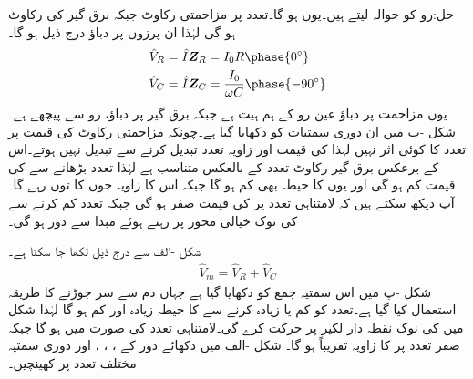 حل:رو کو حوالہ لیتے ہیں۔یوں  ہو گا۔تعدد  پر مزاحمتی رکاوٹ  جبکہ  برق گیر کی رکاوٹ  ہو گی لہٰذا ان پرزوں پر دباؤ درج ذیل ہو گا۔
\begin{align*}
\hat{V}_R&=\hat{I} \bZ_R=I_0 R \phase{0^{\circ}}\\
\hat{V}_C&=\hat{I} \bZ_C=\frac{I_0}{ \omega C} \phase{-90^{\circ}}
\end{align*}
یوں مزاحمت پر دباؤ عین رو کے ہم ہیت ہے جبکہ برق گیر پر دباؤ، رو سے  پیچھے ہے۔شکل -ب میں ان دوری سمتیات کو دکھایا گیا ہے۔چونکہ مزاحمتی رکاوٹ کی قیمت پر تعدد کا کوئی اثر نہیں لہٰذا  کی قیمت اور زاویہ تعدد تبدیل کرنے سے تبدیل نہیں ہوتے۔اس کے برعکس برق گیر رکاوٹ تعدد کے بالعکس متناسب ہے لہٰذا تعدد بڑھانے سے  کی قیمت کم ہو گی اور یوں  کا حیطہ بھی کم ہو گا جبکہ اس کا زاویہ جوں کا توں رہے گا۔آپ دیکھ سکتے ہیں کہ لامتناہی تعدد پر  کی قیمت صفر ہو گی جبکہ تعدد کم کرنے سے  کی نوک خیالی محور پر رہتے ہوئے  مبدا سے دور ہو گی۔

شکل -الف سے درج ذیل لکھا جا سکتا ہے۔
\begin{align*}
\hat{V}_m=\hat{V}_R+\hat{V}_C
\end{align*}
شکل -پ میں اس سمتیہ جمع کو دکھایا گیا ہے جہاں دم سے سر جوڑنے کا طریقہ استعمال کیا گیا ہے۔تعدد کو کم یا زیادہ کرنے  سے  کا حیطہ زیادہ اور کم ہو گا لہٰذا شکل میں  کی نوک نقطہ دار لکیر پر حرکت کرے گی۔لامتناہی تعدد کی صورت میں  ہو گا جبکہ صفر  تعدد پر  کا زاویہ تقریباً  ہو گا۔ 
شکل -الف  میں دکھائے دور کے  ، ، ،  اور  دوری سمتیہ مختلف تعدد پر کھینچیں۔

